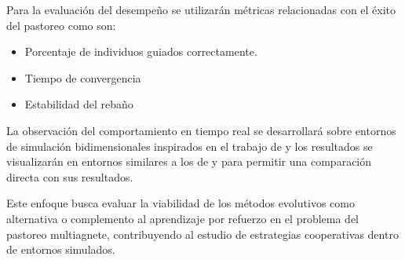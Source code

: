 \documentclass[final]{article}
\begin{document}
Para la evaluación del desempeño se utilizarán métricas relacionadas con el éxito del pastoreo como son:
\begin{itemize}
    \item Porcentaje de individuos guiados correctamente.
    \item Tiempo de convergencia
    \item Estabilidad del rebaño
\end{itemize}

La observación del comportamiento en tiempo real se desarrollará sobre entornos de simulación bidimensionales inspirados en el trabajo de \citet{SankarShepherding} y los resultados se visualizarán en entornos similares a los de \citet{NapolitanoShepherding} y \citet{CovoneShepherding} para permitir una comparación directa con sus resultados.

Este enfoque busca evaluar la viabilidad de los métodos evolutivos como alternativa o complemento al aprendizaje por refuerzo en el problema del pastoreo multiagnete, contribuyendo al estudio de estrategias cooperativas dentro de entornos simulados.



\end{document}

